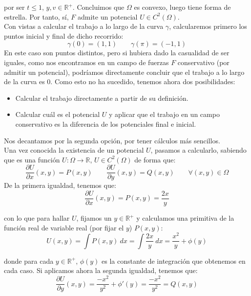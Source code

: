 \begin{ejercicio*}
    por ser $t\leq 1$, $y,v\in \mathbb{R}^+$. Concluimos que $\Omega$ es convexo, luego tiene forma de estrella. Por tanto, sí, $F$ admite un potencial $U\in C^2(\Omega)$.\\

    Con vistas a calcular el trabajo a lo largo de la curva $\gamma$, calcularemos primero los puntos inicial y final de dicho recorrido:
    \begin{equation*}
        \gamma(0) = (1,1) \qquad \gamma(\pi) = (-1,1)
    \end{equation*}
    En este caso son puntos distintos, pero si hubiera dado la casualidad de ser iguales, como nos encontramos en un campo de fuerzas $F$ conservativo (por admitir un potencial), podríamos directamente concluir que el trabajo a lo largo de la curva es 0. Como esto no ha sucedido, tenemos ahora dos posibilidades:
    \begin{itemize}
        \item Calcular el trabajo directamente a partir de su definición.
        \item Calcular cuál es el potencial $U$ y aplicar que el trabajo en un campo conservativo es la diferencia de los potenciales final e inicial.
    \end{itemize}
    Nos decantamos por la segunda opción, por tener cálculos más sencillos.\\

    Una vez conocida la existencia de un potencial $U$, pasamos a calcularlo, sabiendo que es una función $U:\Omega\rightarrow\mathbb{R}$, $U\in C^2(\Omega)$ de forma que:
    \begin{equation*}
        \dfrac{\partial U}{\partial x}(x,y) = P(x,y) \qquad \dfrac{\partial U}{\partial y}(x,y) = Q(x,y) \qquad \forall (x,y)\in \Omega
    \end{equation*}
    De la primera igualdad, tenemos que:
    \begin{equation*}
        \dfrac{\partial U}{\partial x}(x,y) = P(x,y) = \dfrac{2x}{y}
    \end{equation*}
    
    con lo que para hallar $U$, fijamos un $y\in \mathbb{R}^+$ y calculamos una primitiva de la función real de variable real (por fijar el $y$) $P(x,y)$:
    \begin{equation*}
        U(x,y) = \int P(x,y)~dx  = \int \dfrac{2x}{y}~dx  = \dfrac{x^2}{y} + \phi(y)
    \end{equation*}

    donde para cada $y\in \mathbb{R}^+$, $\phi(y)$ es la constante de integración que obtenemos en cada caso. Si aplicamos ahora la segunda igualdad, tenemos que:
    \begin{equation*}
        \dfrac{\partial U}{\partial y}(x,y) = \dfrac{-x^2}{y^2} + \phi'(y) = \dfrac{-x^2}{y^2} = Q(x,y)
    \end{equation*}


\end{ejercicio*}
